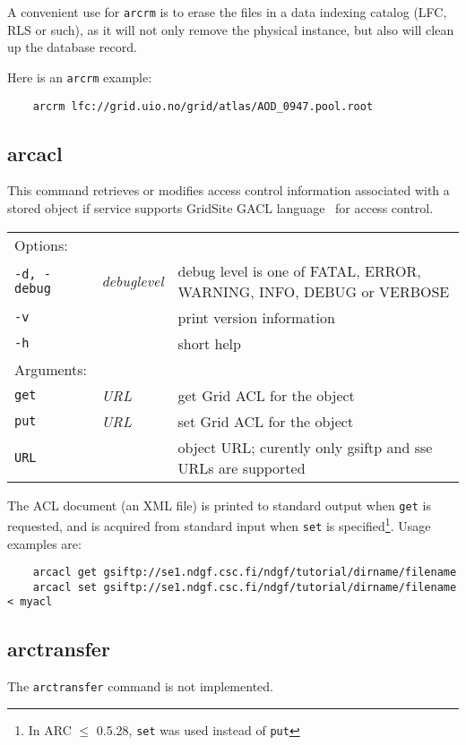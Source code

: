 \begin{framed}
   A convenient use for \texttt{arcrm} is to erase the files in a data
   indexing catalog (LFC, RLS or such), as it will not only remove the
   physical instance, but also will clean up the database record.
\end{framed}

Here is an \texttt{arcrm} example:

\begin{verbatim}
    arcrm lfc://grid.uio.no/grid/atlas/AOD_0947.pool.root
\end{verbatim}

\subsection{arcacl}\label{sec:arcacl}

This command retrieves or modifies
access control information associated with a stored object if service
supports GridSite GACL language~\cite{gacl} for access control.
\hspace*{0.5cm}
\begin{shaded}
\end{shaded}
\begin{longtable}{llp{8cm}}
   Options:&&\\
    \texttt{-d, -debug} & \textit{debuglevel} &debug level is one of  FATAL, ERROR, WARNING, INFO, DEBUG or VERBOSE\\
    \texttt{-v} && print version information\\
    \texttt{-h} && short help\\
   Arguments:&&\\
    \texttt{get} &\textit{URL}& get Grid ACL for the object\\
    \texttt{put} &\textit{URL}& set Grid ACL for the object\\
    \texttt{URL} && object URL; curently only gsiftp and sse URLs are supported\\
\end{longtable}

The ACL document (an XML file) is printed to standard output when
\texttt{get} is requested, and is acquired from standard input when
\texttt{set} is specified\footnote{In ARC $\leq$ 0.5.28, \texttt{set}
  was used instead of \texttt{put}}. Usage examples are:
\begin{verbatim}
    arcacl get gsiftp://se1.ndgf.csc.fi/ndgf/tutorial/dirname/filename
    arcacl set gsiftp://se1.ndgf.csc.fi/ndgf/tutorial/dirname/filename < myacl
\end{verbatim}

\subsection{arctransfer}\label{sec:arctransfer}
The \texttt{arctransfer} command is not implemented.

